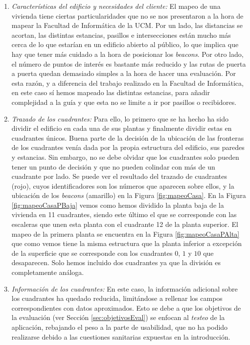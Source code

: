 \begin{enumerate}
	\item \textit{Características del edificio y necesidades del cliente:} El mapeo de una vivienda tiene ciertas particularidades que no se nos presentaron a la hora de mapear la Facultad de Informática de la UCM. Por un lado, las distancias se acortan, las distintas estancias, pasillos e intersecciones están mucho más cerca de lo que estarían en un edificio abierto al público, lo que implica que hay que tener más cuidado a la hora de posicionar los \textit{beacons}. Por otro lado, el número de puntos de interés es bastante más reducido y las rutas de puerta a puerta quedan demasiado simples a la hora de hacer una evaluación. Por esta razón, y a diferencia del trabajo realizado en la Facultad de Informática, en este caso sí hemos mapeado las distintas estancias, para añadir complejidad a la guía y que esta no se limite a ir por pasillos o recibidores.
	
	\item \textit{Trazado de los cuadrantes:} Para ello, lo primero que se ha hecho ha sido dividir el edificio en cada una de sus plantas y finalmente dividir estas en cuadrantes únicos. Buena parte de la decisión de la ubicación de las fronteras de los cuadrantes venía dada por la propia estructura del edificio, sus paredes y estancias. Sin embargo, no se debe olvidar que los cuadrantes solo pueden tener un punto de decisión y que no pueden colindar con más de un cuadrante por lado. Se puede ver el resultado del trazado de cuadrantes (rojo), cuyos identificadores son los números que aparecen sobre ellos, y la ubicación de los \textit{beacons} (amarillo) en la Figura \ref{fig:mapeoCasa}. En la Figura \ref{fig:mapeoCasaPBaja} vemos como hemos dividido la planta baja de la vivienda en 11 cuadrantes, siendo este último el que se corresponde con las escaleras que unen esta planta con el cuadrante 12 de la planta superior. El mapeo de la primera planta se encuentra en la Figura \ref{fig:mapeoCasaPAlta} que como vemos tiene la misma estructura que la planta inferior a excepción de la superficie que se corresponde con los cuadrantes $0$, $1$ y $10$ que desaparecen. Solo hemos incluido dos cuadrantes ya que la división es completamente análoga.	
	
	\item \textit{Información de los cuadrantes:} En este caso, la información adicional sobre los cuadrantes ha quedado reducida, limitándose a rellenar los campos correspondientes con datos aproximados. Esto se debe a que los objetivos de la evaluación (ver Sección \ref{sec:objetivosEval}) se enfocan al \textit{testeo} de la aplicación, rebajando el peso a la parte de usabilidad, que no ha podido realizarse debido a las cuestiones sanitarias expuestas en la introducción. 
	

\end{enumerate}
